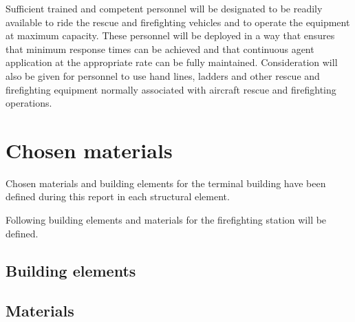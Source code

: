 	Sufficient trained and competent personnel will be designated to be readily available to ride the rescue and firefighting vehicles and to operate the equipment at maximum capacity. These personnel will be deployed in a way that ensures that minimum response times can be achieved and that continuous agent application at the appropriate rate can be fully maintained. Consideration will also be given for personnel to use hand lines, ladders and other rescue and firefighting equipment normally associated with aircraft rescue and firefighting operations.
	
\section{Chosen materials}
Chosen materials and building elements for the terminal building have been defined during this report in each structural element. 

Following building elements and materials for the firefighting station will be defined.
		\subsection{Building elements}
		
		\subsection{Materials}
		